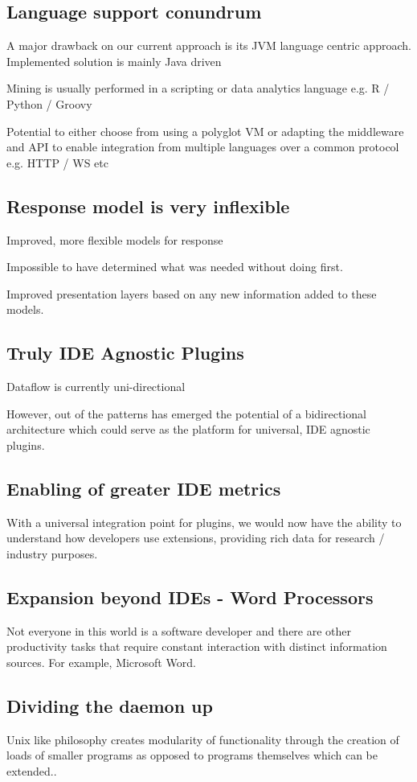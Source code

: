 \subsection{Language support conundrum}

A major drawback on our current approach is its JVM language centric approach.
Implemented solution is mainly Java driven

Mining is usually performed in a scripting or data analytics language e.g. R / Python / Groovy

Potential to either choose from using a polyglot VM or adapting the middleware and API to enable integration from multiple languages over a common protocol e.g. HTTP / WS etc

\subsection{Response model is very inflexible}

Improved, more flexible models for response

Impossible to have determined what was needed without doing first.

Improved presentation layers based on any new information added to these models.

\subsection{Truly IDE Agnostic Plugins}

Dataflow is currently uni-directional

However, out of the patterns has emerged the potential of a bidirectional architecture which could serve as the platform for universal, IDE agnostic plugins.

\subsection{Enabling of greater IDE metrics}

With a universal integration point for plugins, we would now have the ability to understand how developers use extensions, providing rich data for research / industry purposes.

\subsection{Expansion beyond IDEs - Word Processors}

Not everyone in this world is a software developer and there are other productivity tasks that require constant interaction with distinct information sources. For example, Microsoft Word.

\subsection{Dividing the daemon up}

Unix like philosophy creates modularity of functionality through the creation of loads of smaller programs as opposed to programs themselves which can be extended..


